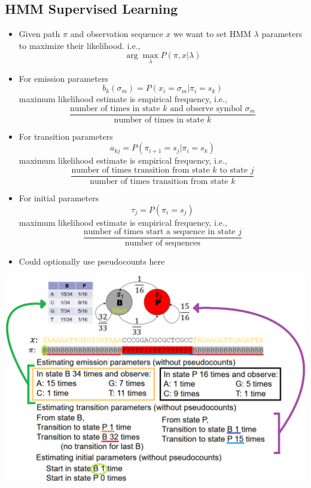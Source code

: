 \documentclass[10pt]{article}
\begin{document}
\subsection*{HMM Supervised Learning}
\begin{itemize}
	\item Given path $\pi$ and observation sequence $x$ we want to set HMM $\lambda$ parameters to maximize their likelihood.  i.e.,
	\[\arg\max_\lambda P(\pi, x | \lambda)\]
    \item For emission parameters
    \[b_k(\sigma_m) = P(x_i = \sigma_m | \pi_i = s_k)\]
    maximum likelihood estimate is empirical frequency, i.e.,
    \[\frac{\text{number of times in state $k$ and observe symbol $\sigma_m$}}{\text{number of times in state $k$}}\]
    \item For transition parameters
    \[a_{kj} = P(\pi_{i + 1} = s_j | \pi_i = s_k)\]
    maximum likelihood estimate is empirical frequency, i.e.,
    \[\frac{\text{number of times transition from state $k$ to state $j$}}{\text{number of times transition from state $k$}}\]
    \item For initial parameters
    \[\tau_j = P(\pi_i = s_j)\]
    maximum likelihood estimate is empirical frequency, i.e.,
    \[\frac{\text{number of times start a sequence in state $j$}}{\text{number of sequences}}\]
    \item Could optionally use pseudocounts here
\end{itemize}
\begin{center} 
	\includegraphics*[width=\textwidth]{W9_30.png} 
\end{center}
\end{document}
